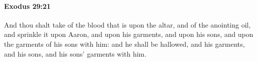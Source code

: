 
		\paragraph{Exodus 29:21} %
			\label{EXODUS-29-21}

			And thou shalt take of the blood that is upon the altar, and of the anointing oil, and sprinkle it upon Aaron, and upon his garments, and upon his sons, and upon the garments of his sons with him: and he shall be hallowed, and his garments, and his sons, and his sons' garments with him.


